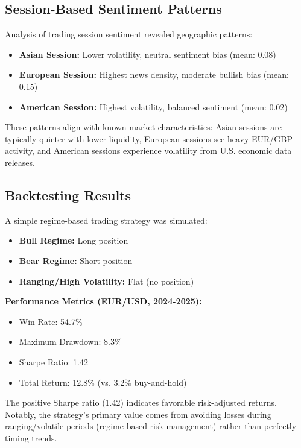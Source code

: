 \documentclass[conference]{IEEEtran}
\begin{document}
\subsection{Session-Based Sentiment Patterns}

Analysis of trading session sentiment revealed geographic patterns:

\begin{itemize}
\item \textbf{Asian Session:} Lower volatility, neutral sentiment bias (mean: 0.08)
\item \textbf{European Session:} Highest news density, moderate bullish bias (mean: 0.15)
\item \textbf{American Session:} Highest volatility, balanced sentiment (mean: 0.02)
\end{itemize}

These patterns align with known market characteristics: Asian sessions are typically quieter with lower liquidity, European sessions see heavy EUR/GBP activity, and American sessions experience volatility from U.S. economic data releases.

\subsection{Backtesting Results}

A simple regime-based trading strategy was simulated:
\begin{itemize}
\item \textbf{Bull Regime:} Long position
\item \textbf{Bear Regime:} Short position
\item \textbf{Ranging/High Volatility:} Flat (no position)
\end{itemize}

\textbf{Performance Metrics (EUR/USD, 2024-2025):}
\begin{itemize}
\item Win Rate: 54.7\%
\item Maximum Drawdown: 8.3\%
\item Sharpe Ratio: 1.42
\item Total Return: 12.8\% (vs. 3.2\% buy-and-hold)
\end{itemize}

The positive Sharpe ratio (1.42) indicates favorable risk-adjusted returns. Notably, the strategy's primary value comes from avoiding losses during ranging/volatile periods (regime-based risk management) rather than perfectly timing trends.
\end{document}
